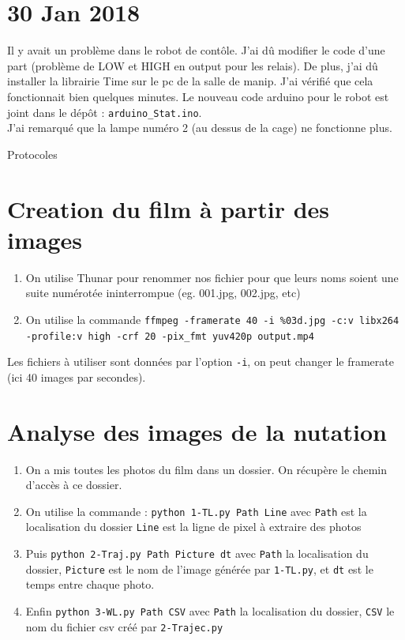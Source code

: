 \documentclass[10pt,a4paper]{article}
\begin{document}
\section{30 Jan 2018}

Il y avait un problème dans le robot de contôle. J'ai dû modifier le code d'une part (problème de LOW et HIGH en output pour les relais). De plus, j'ai dû installer la librairie Time sur le pc de la salle de manip. J'ai vérifié que cela fonctionnait bien quelques minutes. Le nouveau code arduino pour le robot est joint dans le dépôt : \texttt{arduino\_Stat.ino}.\\

J'ai remarqué que la lampe numéro 2 (au dessus de la cage) ne fonctionne plus.





\newpage
\begin{center}
        {\Huge Protocoles}
\end{center}
\appendix

\section{Creation du film à partir des images\label{film}}
\begin{enumerate}
        \item On utilise Thunar pour renommer nos fichier pour que leurs noms soient une suite numérotée ininterrompue (eg. 001.jpg, 002.jpg, etc)
        \item On utilise la commande \texttt{ffmpeg -framerate 40 -i \%03d.jpg -c:v libx264 -profile:v high -crf 20 -pix\_fmt yuv420p output.mp4}
\end{enumerate}
Les fichiers à utiliser sont données par l'option \texttt{-i}, on peut changer le framerate (ici 40 images par secondes).

\section{Analyse des images de la nutation\label{anaNut}}
\begin{enumerate}
    \item On a mis toutes les photos du film dans un dossier. On récupère le chemin d'accès à ce dossier.
    \item On utilise la commande : \texttt{python 1-TL.py Path Line} avec \texttt{Path} est la localisation du dossier \texttt{Line} est la ligne de pixel à extraire des photos
    \item Puis \texttt{python 2-Traj.py Path Picture dt} avec \texttt{Path} la localisation du dossier, \texttt{Picture} est le nom de l'image générée par \texttt{1-TL.py}, et \texttt{dt} est le temps entre chaque photo.
    \item Enfin \texttt{python 3-WL.py Path CSV} avec \texttt{Path} la localisation du dossier, \texttt{CSV} le nom du fichier csv créé par \texttt{2-Trajec.py}
\end{enumerate}
\end{document}
